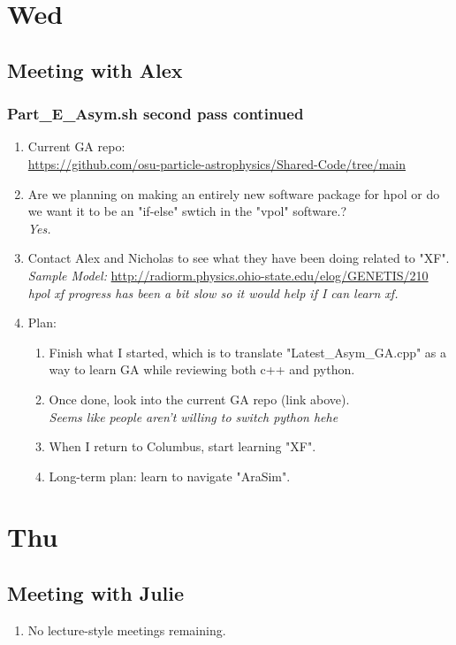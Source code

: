 \documentclass[12pt,letterpaper]{article}
\begin{document}
\section{Wed}
\subsection{Meeting with Alex}
\subsubsection{Part\_E\_Asym.sh second pass continued}
\begin{enumerate}
  \item Current GA repo:\\
    \url{https://github.com/osu-particle-astrophysics/Shared-Code/tree/main}
  \item Are we planning on making an entirely new software package for hpol or
    do we want it to be an "if-else" swtich in the "vpol" software.? \\
    \textit{Yes.}
  \item Contact Alex and Nicholas to see what they have been doing related to "XF".\\
    \textit{Sample Model:}
    \url{http://radiorm.physics.ohio-state.edu/elog/GENETIS/210}\\
    \textit{hpol xf progress has been a bit slow so it would help if I can learn xf.}
  \item Plan:
    \begin{enumerate}
      \item Finish what I started, which is to translate "Latest_Asym_GA.cpp" as a way
        to learn GA while reviewing both c++ and python.
      \item Once done, look into the current GA repo (link above).\\
        \textit{Seems like people aren't willing to switch python hehe}
      \item When I return to Columbus, start learning "XF".
      \item Long-term plan: learn to navigate "AraSim".
    \end{enumerate}
\end{enumerate}

\section{Thu}
\subsection{Meeting with Julie}
\begin{enumerate}
  \item No lecture-style meetings remaining.
\end{enumerate}
\end{document}
